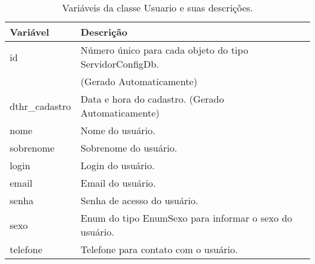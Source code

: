 \begin{table}
\centering
\begin{tabular}{|l|l|}
\hline
{\color[HTML]{000000} \textbf{Variável}} & {\color[HTML]{000000} \textbf{Descrição}}                                        \\ \hline
id                                       & Número único para cada objeto do tipo ServidorConfigDb. \\
																				 & (Gerado Automaticamente) 																												\\ \hline
dthr\_cadastro                           & Data e hora do cadastro. (Gerado Automaticamente)                                \\ \hline
nome                                     & Nome do usuário.                                                                 \\ \hline
sobrenome                                & Sobrenome do usuário.                                                            \\ \hline
login                                    & Login do usuário.                                                                \\ \hline
email                                    & Email do usuário.                                                                \\ \hline
senha                                    & Senha de acesso do usuário.                                                      \\ \hline
sexo                                     & Enum do tipo EnumSexo para informar o sexo do usuário.                           \\ \hline
telefone                                 & Telefone para contato com o usuário.                                             \\ \hline
\end{tabular}
\caption[Variáveis da classe Usuario e suas descrições.]{Variáveis da classe Usuario e suas descrições.}
\label{Tab:VariaveisUsuario}
\end{table}


